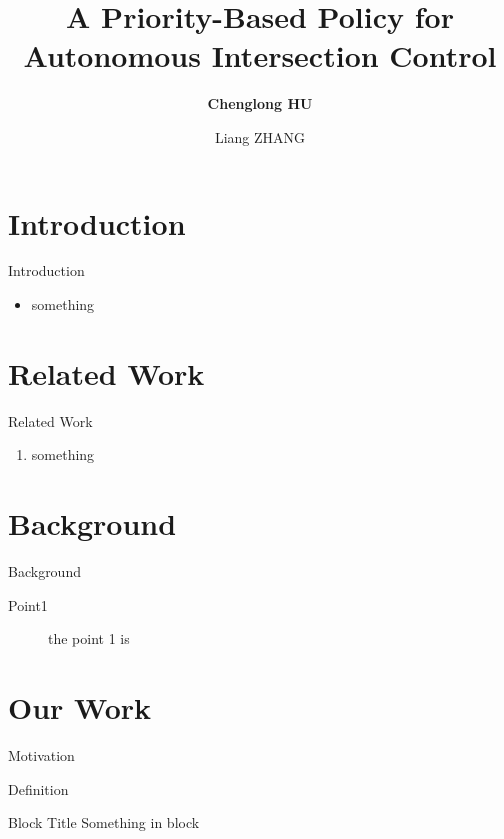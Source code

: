 \documentclass[compress]{beamer}
\title[Priority-based Policy]{A Priority-Based Policy for \\Autonomous Intersection Control}
\author[Chenglong Hu]{\textbf{Chenglong HU} \and Liang ZHANG}
\institute[Fudan University]{
    School of Computer Science \\
    Fudan University, Shanghai \\
    200433, China
}
\begin{document}
  \begin{frame}
  \titlepage
  \end{frame}
  
\section{Introduction}
  \begin{frame}{Introduction}
    \begin{itemize}
        \item something
    \end{itemize}
  \end{frame}
  
\section{Related Work}
  \begin{frame}{Related Work}
    \begin{enumerate}
        \item something
    \end{enumerate}
  \end{frame}
  
\section{Background}
  \begin{frame}{Background}
    \begin{description}
      \item[Point1] the point 1 is 
    \end{description}
  \end{frame}

\section{Our Work}
  \begin{frame}{Motivation}
    
  \end{frame}

  \begin{frame}{Definition}
    \begin{block}{Block Title}
      Something in block
    \end{block}    
  \end{frame}
  
\end{document}
